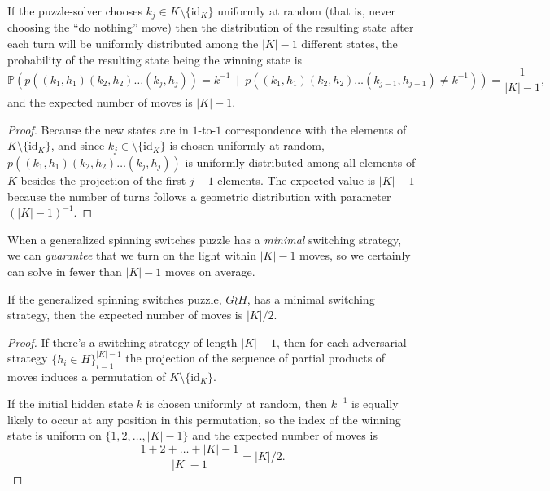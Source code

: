 \begin{proposition}
  If the puzzle-solver chooses $k_j \in K \setminus \{\mathrm{id}_K\}$ uniformly
  at random (that is, never choosing the ``do nothing'' move)
  then the distribution of the resulting state after each turn will be uniformly
  distributed
  among the $|K| - 1$ different states, the probability of the resulting state
  being the winning state is
  \begin{equation}
    \mathbb{P}(p((k_1, h_1)(k_2, h_2)\dots(k_j, h_j))=k^{-1}\ \mid\ p((k_1, h_1)(k_2, h_2)\dots(k_{j-1}, h_{j-1})\neq k^{-1})) = \frac{1}{|K| - 1},
  \end{equation} and the expected number of moves is $|K| - 1$.
\label{prop:randomStrategy}
\end{proposition}
\begin{proof}
  Because the new states are in $1$-to-$1$ correspondence with the elements of
  $K \setminus \{\mathrm{id}_K\}$, and since
  $k_j \in \setminus \{\mathrm{id}_K\}$
  is chosen uniformly at random, $p((k_1, h_1)(k_2, h_2)\dots(k_j, h_j))$
  is uniformly distributed among all elements of $K$ besides the projection of
  the first $j-1$ elements.
  The expected value is $|K| - 1$ because the number of turns follows a
  geometric distribution with parameter ${(|K| - 1)^{-1}}$.
\end{proof}

When a generalized spinning switches puzzle has a \textit{minimal} switching
strategy, we can \textit{guarantee} that we turn on the light within $|K|-1$
moves, so we certainly can solve in fewer than $|K|-1$ moves on average.

\begin{proposition}
If the generalized spinning switches puzzle, $G \wr H$, has a minimal switching
strategy, then the expected number of moves is $|K|/2$.
\end{proposition}
\begin{proof}
  If there's a switching strategy of length $|K| - 1$,
  then for each adversarial strategy $\{h_i \in H\}_{i=1}^{|K| - 1}$
  the projection of the sequence of partial products of moves induces
  a permutation of $K \setminus \{\mathrm{id}_K\}$.

  If the initial hidden state $k$ is chosen uniformly at random, then
  $k^{-1}$ is equally likely to occur at any position in this permutation,
  so the index of the winning state is uniform on
  ${\{1, 2, \dots, |K| - 1\}}$ and the expected number of moves is
  \begin{equation}
    \frac{1 + 2 + \dots + |K| - 1}{|K| - 1} = |K|/2.
  \end{equation}
\end{proof}

